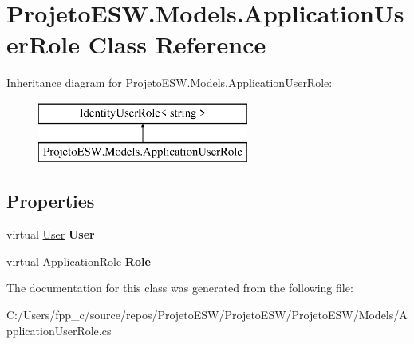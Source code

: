\hypertarget{class_projeto_e_s_w_1_1_models_1_1_application_user_role}{}\section{Projeto\+E\+S\+W.\+Models.\+Application\+User\+Role Class Reference}
\label{class_projeto_e_s_w_1_1_models_1_1_application_user_role}
Inheritance diagram for Projeto\+E\+S\+W.\+Models.\+Application\+User\+Role\+:\begin{figure}[H]
\begin{center}
\leavevmode
\includegraphics[height=2.000000cm]{class_projeto_e_s_w_1_1_models_1_1_application_user_role}
\end{center}
\end{figure}
\subsection*{Properties}
\begin{DoxyCompactItemize}
\item 
\mbox{\label{class_projeto_e_s_w_1_1_models_1_1_application_user_role_a47a94889e0b20d9f23cb0b69b8721e58}} 
virtual \mbox{\hyperlink{class_projeto_e_s_w_1_1_models_1_1_user}{User}} {\bfseries User}
\item 
\mbox{\label{class_projeto_e_s_w_1_1_models_1_1_application_user_role_a7caaa10f9f51b96d29cef95b82f6c619}} 
virtual \mbox{\hyperlink{class_projeto_e_s_w_1_1_models_1_1_application_role}{Application\+Role}} {\bfseries Role}
\end{DoxyCompactItemize}


The documentation for this class was generated from the following file\+:\begin{DoxyCompactItemize}
\item 
C\+:/\+Users/fpp\+\_\+c/source/repos/\+Projeto\+E\+S\+W/\+Projeto\+E\+S\+W/\+Projeto\+E\+S\+W/\+Models/Application\+User\+Role.\+cs\end{DoxyCompactItemize}
